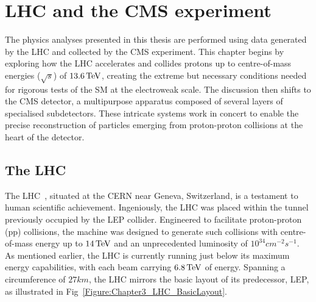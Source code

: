 \chapter{LHC and the CMS experiment}
\thispagestyle{plain}  %
\pagestyle{chapterpages}
\label{Section:Chapter3}

The physics analyses presented in this thesis are performed using data generated by the LHC and collected by the \ac{CMS} experiment. This chapter begins by exploring how the LHC accelerates and collides protons up to centre-of-mass energies ($\sqrt{s}$) of $13.6\,\text{Te\hspace{-.08em}V}$, creating the extreme but necessary conditions needed for rigorous tests of the SM at the electroweak scale. The discussion then shifts to the CMS detector, a multipurpose apparatus composed of several layers of specialised subdetectors. These intricate systems work in concert to enable the precise reconstruction of particles emerging from proton-proton collisions at the heart of the detector.

\section{The LHC}

The LHC~\cite{LHC_1}, situated at the \ac{CERN} near Geneva, Switzerland, is a testament to human scientific achievement. Ingeniously, the LHC was placed within the tunnel previously occupied by the \ac{LEP} collider. Engineered to facilitate proton-proton (pp) collisions, the machine was designed to generate such collisions with centre-of-mass energy up to $14\,\text{Te\hspace{-.08em}V}$ and an unprecedented luminosity of $10^{34}\unit{cm}^{-2}\unit{s}^{-1}$. As mentioned earlier, the LHC is currently running just below its maximum energy capabilities, with each beam carrying $6.8\,\text{Te\hspace{-.08em}V}$ of energy. Spanning a circumference of $27\unit{km}$, the LHC mirrors the basic layout of its predecessor, LEP, as illustrated in Fig~\ref{Figure:Chapter3_LHC_BasicLayout}. 

